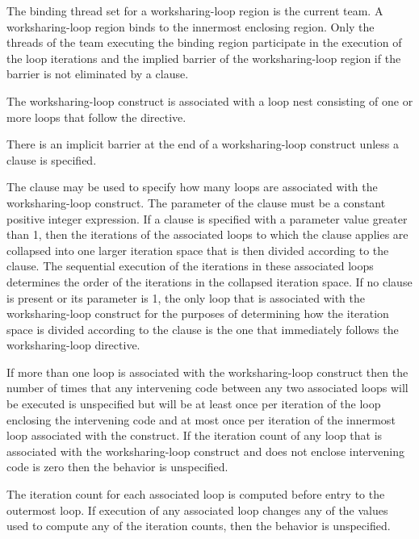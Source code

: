 \binding
The binding thread set for a worksharing-loop region is the current team. A
worksharing-loop region binds to the
innermost enclosing  region. Only the threads of the team executing the
binding  region participate in the execution of the loop iterations and the
implied barrier of the worksharing-loop region if the barrier is not eliminated by a  clause.

\descr
The worksharing-loop construct is associated with a loop nest consisting of one or more loops that
follow the directive.

There is an implicit barrier at the end of a worksharing-loop construct unless a  clause is
specified.

The  clause may be used to specify how many loops are
associated with the worksharing-loop construct. The parameter of the 
clause must be a constant positive integer expression. If a 
clause is specified with a parameter value greater than 1, then the
iterations of the associated loops to which the clause applies are collapsed
into one larger iteration space that is then divided according
to the  clause. The sequential execution of the iterations
in these associated loops determines the order of the iterations in the
collapsed iteration space. If no  clause is present or its
parameter is 1, the only loop that is associated with the worksharing-loop construct
for the purposes of determining how the iteration space is divided according
to the  clause is the one that immediately follows the
worksharing-loop directive.

If more than one loop is associated with the worksharing-loop construct then the
number of times that any intervening code between any two associated
loops will be executed is unspecified but will be at least once per
iteration of the loop enclosing the intervening code and at most once
per iteration of the innermost loop associated with the construct. If the
iteration count of any loop that is associated with the worksharing-loop construct and does not
enclose intervening code is zero then the behavior is unspecified.

The iteration count for each associated loop is computed before entry to the
outermost loop. If execution of any associated loop changes any of the values
used to compute any of the iteration counts, then the behavior is unspecified.

